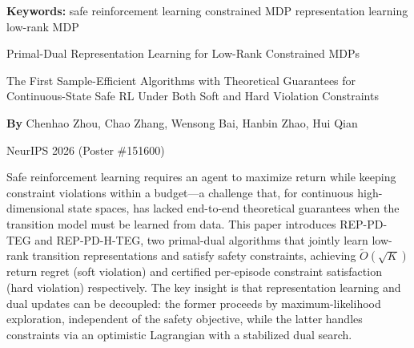 \documentclass[10pt,twocolumn]{article}
\begin{document}
\setlength{\parindent}{0pt}
\setlength{\parskip}{4pt}

{\small\color{keywordgray}\textbf{Keywords:}
  safe reinforcement learning \textbullet{}
  constrained MDP \textbullet{}
  representation learning \textbullet{}
  low-rank MDP}\par\vspace{4pt}

{\LARGE\bfseries\raggedright
  Primal-Dual Representation Learning for Low-Rank Constrained MDPs}\par\vspace{4pt}

{\large\itshape\raggedright
  The First Sample-Efficient Algorithms with Theoretical Guarantees for
  Continuous-State Safe RL Under Both Soft and Hard Violation Constraints}\par\vspace{6pt}

{\small\textbf{By} Chenhao Zhou, Chao Zhang, Wensong Bai, Hanbin Zhao,
  Hui Qian}\par\vspace{2pt}

{\small\color{keywordgray}NeurIPS 2026 (Poster \#151600)}
\par\vspace{2pt}\noindent{\color{rulered}\rule{\columnwidth}{0.6pt}}\vspace{6pt}

Safe reinforcement learning requires an agent to maximize return while
keeping constraint violations within a budget---a challenge that, for
continuous high-dimensional state spaces, has lacked end-to-end
theoretical guarantees when the transition model must be learned from
data. This paper introduces REP-PD-TEG and REP-PD-H-TEG, two
primal-dual algorithms that jointly learn low-rank transition
representations and satisfy safety constraints, achieving
$\tilde{O}(\sqrt{K})$ return regret (soft violation) and certified
per-episode constraint satisfaction (hard violation) respectively. The
key insight is that representation learning and dual updates can be
decoupled: the former proceeds by maximum-likelihood exploration,
independent of the safety objective, while the latter handles constraints
via an optimistic Lagrangian with a stabilized dual search.
\end{document}
